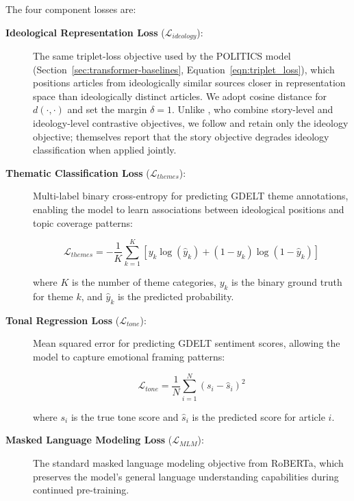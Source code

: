 The four component losses are:

\begin{description}
    \item[\textbf{Ideological Representation Loss} ($\mathcal{L}_{ideology}$):] The same triplet-loss objective used by the POLITICS model (Section~\ref{sec:transformer-baselines}, Equation~\ref{eqn:triplet_loss}), which positions articles from ideologically similar sources closer in representation space than ideologically distinct articles. We adopt cosine distance for $d(\cdot,\cdot)$ and set the margin $\delta = 1$. Unlike \citet{liu2022politics}, who combine story-level and ideology-level contrastive objectives, we follow \citet{baly2020we} and retain only the ideology objective; \citet{liu2022politics} themselves report that the story objective degrades ideology classification when applied jointly.
    
    \item[\textbf{Thematic Classification Loss} ($\mathcal{L}_{themes}$):] Multi-label binary cross-entropy for predicting GDELT theme annotations, enabling the model to learn associations between ideological positions and topic coverage patterns:
    
    \begin{equation}
    \mathcal{L}_{themes} = -\frac{1}{K} \sum_{k=1}^{K} \left[ y_k \log(\hat{y}_k) + (1-y_k) \log(1-\hat{y}_k) \right] \label{eq:theme-loss}
    \end{equation}
    
    where $K$ is the number of theme categories, $y_k$ is the binary ground truth for theme $k$, and $\hat{y}_k$ is the predicted probability.
    
    \item[\textbf{Tonal Regression Loss} ($\mathcal{L}_{tone}$):] Mean squared error for predicting GDELT sentiment scores, allowing the model to capture emotional framing patterns:
    
    \begin{equation}
    \mathcal{L}_{tone} = \frac{1}{N} \sum_{i=1}^{N} (s_i - \hat{s}_i)^2 \label{eq:tone-loss}
    \end{equation}
    
    where $s_i$ is the true tone score and $\hat{s}_i$ is the predicted score for article $i$.

    \item[\textbf{Masked Language Modeling Loss} ($\mathcal{L}_{MLM}$):] The standard masked language modeling objective from RoBERTa, which preserves the model's general language understanding capabilities during continued pre-training.
\end{description}

